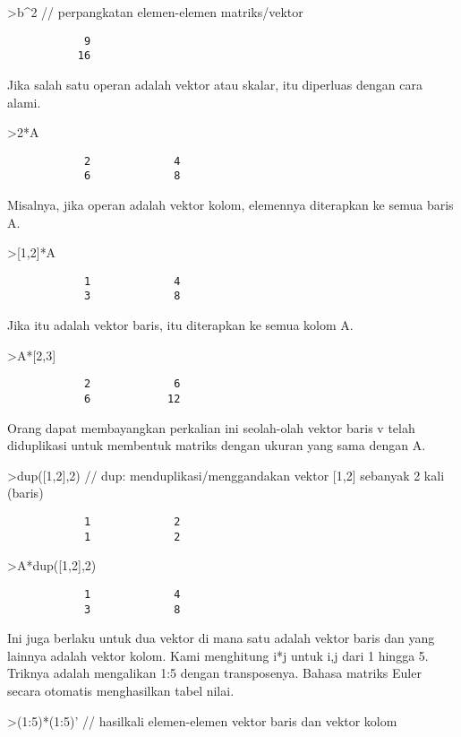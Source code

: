 \documentclass[
]{book}
\begin{document}
\textgreater b\^{}2 // perpangkatan elemen-elemen matriks/vektor

\begin{verbatim}
            9 
           16 
\end{verbatim}

Jika salah satu operan adalah vektor atau skalar, itu diperluas dengan cara alami.

\textgreater2*A

\begin{verbatim}
            2             4 
            6             8 
\end{verbatim}

Misalnya, jika operan adalah vektor kolom, elemennya diterapkan ke semua baris A.

\textgreater{[}1,2{]}*A

\begin{verbatim}
            1             4 
            3             8 
\end{verbatim}

Jika itu adalah vektor baris, itu diterapkan ke semua kolom A.

\textgreater A*{[}2,3{]}

\begin{verbatim}
            2             6 
            6            12 
\end{verbatim}

Orang dapat membayangkan perkalian ini seolah-olah vektor baris v telah diduplikasi untuk membentuk matriks dengan ukuran yang sama dengan A.

\textgreater dup({[}1,2{]},2) // dup: menduplikasi/menggandakan vektor {[}1,2{]} sebanyak 2 kali (baris)

\begin{verbatim}
            1             2 
            1             2 
\end{verbatim}

\textgreater A*dup({[}1,2{]},2)

\begin{verbatim}
            1             4 
            3             8 
\end{verbatim}

Ini juga berlaku untuk dua vektor di mana satu adalah vektor baris dan yang lainnya adalah vektor kolom. Kami menghitung i*j untuk i,j dari 1 hingga 5. Triknya adalah mengalikan 1:5 dengan transposenya. Bahasa matriks Euler secara otomatis menghasilkan tabel nilai.

\textgreater(1:5)*(1:5)' // hasilkali elemen-elemen vektor baris dan vektor kolom
\end{document}
